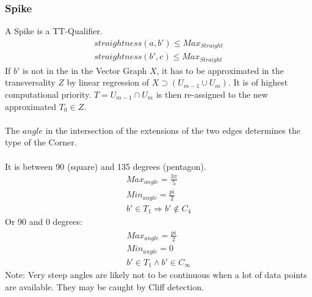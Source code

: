\documentclass{report}
\begin{document}
\subsubsection{Spike}
A Spike is a TT-Qualifier.
\begin{align}
straightness(a,b')\leq Max_{Straight}\\ straightness(b',c)\leq Max_{Straight}
\end{align}
If $b'$ is not in the in the Vector Graph $X$, it has to be approximated in the transversality $Z$ by linear regression of $X\supset (U_{m-1}\cup U_{m})$. It is of highest computational priority. $T=U_{m-1}\cap U_{m}$ is then re-assigned to the new approximated $T_{0}\in Z$.\\\\
The $angle$ in the intersection of the extensions of the two edges determines the type of the Corner.\\\\
It is between 90 (square) and 135 degrees (pentagon).
\begin{align}
Max_{angle}=\frac{3\pi}{5}\\
Min_{angle}=\frac{pi}{2}\\
b' \in T_{1} \Rightarrow b' \not\in C_{4}
\end{align}
Or 90 and 0 degrees:
\begin{align}
Max_{angle}=\frac{pi}{2}\\
Min_{angle}=0\\
b' \in T_{1} \land b' \in C_{\infty}
\end{align}
Note: Very steep angles are likely not to be continuous when a lot of data points are available. They may be caught by Cliff detection.\\
\end{document}
